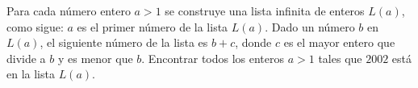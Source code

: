 Para cada número entero $ a>1$ se construye una lista infinita de enteros $ L(a)$, como sigue:
$ a$ es el primer número de la lista $ L(a)$.
Dado un número $ b$ en $ L(a)$, el siguiente número de la lista es $ b+c$, donde $ c$ es el mayor entero que divide a $ b$ y es menor que $ b$.
Encontrar todos los enteros $ a>1$ tales que $ 2002$ está en la lista $ L(a)$.
